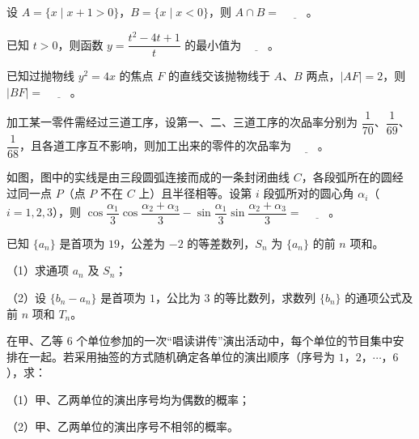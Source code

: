 \begin{question}
设 $A=\{x\mid x+1>0\}$，$B=\{x\mid x<0\}$，则 $A\cap B=$ $\underline{\qquad}$。

\end{question}
\begin{question}
已知 $t>0$，则函数 $y=\dfrac{t^2-4t+1}{t}$ 的最小值为 $\underline{\qquad}$。

\end{question}
\begin{question}
已知过抛物线 $y^2=4x$ 的焦点 $F$ 的直线交该抛物线于 $A$、$B$ 两点，$|AF|=2$，则 $|BF|=$ $\underline{\qquad}$。

\end{question}
\begin{question}
加工某一零件需经过三道工序，设第一、二、三道工序的次品率分别为 $\dfrac{1}{70}$、$\dfrac{1}{69}$、$\dfrac{1}{68}$，且各道工序互不影响，则加工出来的零件的次品率为 $\underline{\qquad}$。

\Needspace{0.4\textheight}
\end{question}
\begingroup
\renewenvironment{question}{\Needspace{0.5\textheight}}{}
\begin{question}
如图，图中的实线是由三段圆弧连接而成的一条封闭曲线 $C$，各段弧所在的圆经过同一点 $P$（点 $P$ 不在 $C$ 上）且半径相等。设第 $i$ 段弧所对的圆心角 $\alpha_i$（$i=1,2,3$），则 $\cos\dfrac{\alpha_1}{3}\cos\dfrac{\alpha_2+\alpha_3}{3}-\sin\dfrac{\alpha_1}{3}\sin\dfrac{\alpha_2+\alpha_3}{3}=$ $\underline{\qquad}$。
\nopagebreak[4]
\begin{center}\end{center}
\nopagebreak[4]
\end{question}
\endgroup
{}
\begin{question}
已知 $\{a_n\}$ 是首项为 $19$，公差为 $-2$ 的等差数列，$S_n$ 为 $\{a_n\}$ 的前 $n$ 项和。

（1）求通项 $a_n$ 及 $S_n$；

（2）设 $\{b_n-a_n\}$ 是首项为 $1$，公比为 $3$ 的等比数列，求数列 $\{b_n\}$ 的通项公式及前 $n$ 项和 $T_n$。

\end{question}
\begin{question}
在甲、乙等 $6$ 个单位参加的一次“唱读讲传”演出活动中，每个单位的节目集中安排在一起。若采用抽签的方式随机确定各单位的演出顺序（序号为 $1$，$2$，$\cdots$，$6$），求：

（1）甲、乙两单位的演出序号均为偶数的概率；

（2）甲、乙两单位的演出序号不相邻的概率。

\end{question}
